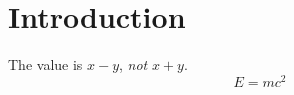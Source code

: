\section{Introduction}
The value is $x - y$, \emph{not} $x + y$.
\begin{equation}
  E = m c^2
\end{equation}
